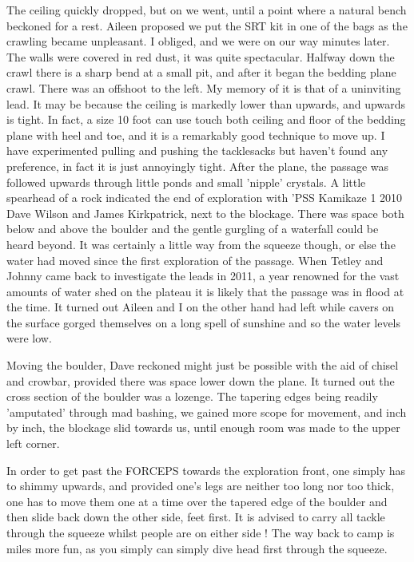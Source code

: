 \documentclass[onecolumn]{book}
\begin{document}
The ceiling quickly dropped, but on we went, until a point where a natural bench beckoned for a rest. Aileen proposed we put the SRT kit in one of the bags as the crawling became unpleasant. I obliged, and we were on our way minutes later. The walls were covered in red dust, it was quite spectacular. Halfway down the crawl there is a sharp bend at a small pit, and after it began the bedding plane crawl. There was an offshoot to the left. My memory of it is that of a uninviting lead. It may be because the ceiling is markedly lower than upwards, and upwards is tight. In fact, a size 10 foot can use touch both ceiling and floor of the bedding plane with heel and toe, and it is a remarkably good technique to move up. I have experimented pulling and pushing the tacklesacks but haven't found any preference, in fact it is just annoyingly tight. After the plane, the passage was followed upwards through little ponds and small 'nipple' crystals. A little spearhead of a rock indicated the end of exploration with 'PSS Kamikaze 1 2010 Dave Wilson and James Kirkpatrick, next to the blockage.
There was space both below and above the boulder and the gentle gurgling of a waterfall could be heard beyond. It was certainly a little way from the squeeze though, or else the water had moved since the first exploration of the passage. When Tetley and Johnny came back to investigate the leads in 2011, a year renowned for the vast amounts of water shed on the plateau it is likely that the passage was in flood at the time. It turned out Aileen and I on the other hand had left while cavers on the surface gorged themselves on a long spell of sunshine and so the water levels were low.

Moving the boulder, Dave reckoned might just be possible with the aid of chisel and crowbar, provided there was space lower down the plane. It turned out the cross section of the boulder was a lozenge. The tapering edges being readily 'amputated' through mad bashing, we gained more scope for movement, and inch by inch, the blockage slid towards us, until enough room was made to the upper left corner.

In order to get past the FORCEPS towards the exploration front, one simply has to shimmy upwards, and provided one's legs are neither too long nor too thick, one has to move them one at a time over the tapered edge of the boulder and then slide back down the other side, feet first. It is advised to carry all tackle through the squeeze whilst people are on either side ! The way back to camp is miles more fun, as you simply can simply dive head first through the squeeze.
\end{document}
